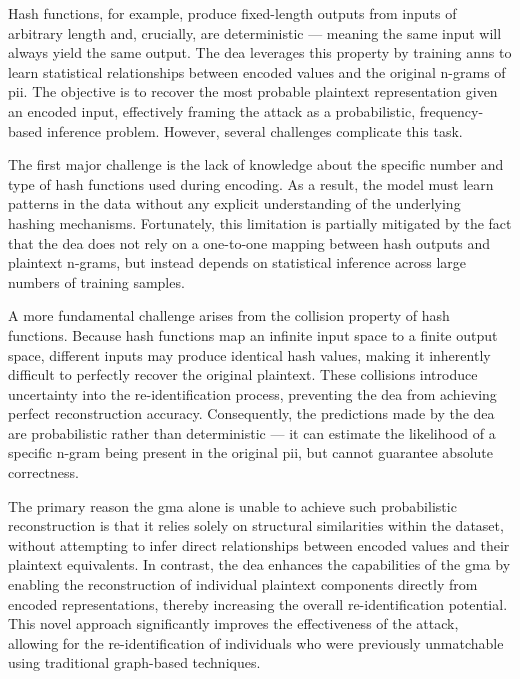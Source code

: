 Hash functions, for example, produce fixed-length outputs from inputs of arbitrary length and, crucially, are deterministic — meaning the same input will always yield the same output.
The \ac{dea} leverages this property by training \ac{ann}s to learn statistical relationships between encoded values and the original n-grams of \ac{pii}.
The objective is to recover the most probable plaintext representation given an encoded input, effectively framing the attack as a probabilistic, frequency-based inference problem.
However, several challenges complicate this task.

The first major challenge is the lack of knowledge about the specific number and type of hash functions used during encoding.
As a result, the model must learn patterns in the data without any explicit understanding of the underlying hashing mechanisms.
Fortunately, this limitation is partially mitigated by the fact that the \ac{dea} does not rely on a one-to-one mapping between hash outputs and plaintext n-grams, but instead depends on statistical inference across large numbers of training samples.

A more fundamental challenge arises from the collision property of hash functions.
Because hash functions map an infinite input space to a finite output space, different inputs may produce identical hash values, making it inherently difficult to perfectly recover the original plaintext.
These collisions introduce uncertainty into the re-identification process, preventing the \ac{dea} from achieving perfect reconstruction accuracy.
Consequently, the predictions made by the \ac{dea} are probabilistic rather than deterministic — it can estimate the likelihood of a specific n-gram being present in the original \ac{pii}, but cannot guarantee absolute correctness.

The primary reason the \ac{gma} alone is unable to achieve such probabilistic reconstruction is that it relies solely on structural similarities within the dataset, without attempting to infer direct relationships between encoded values and their plaintext equivalents.
In contrast, the \ac{dea} enhances the capabilities of the \ac{gma} by enabling the reconstruction of individual plaintext components directly from encoded representations, thereby increasing the overall re-identification potential.
This novel approach significantly improves the effectiveness of the attack, allowing for the re-identification of individuals who were previously unmatchable using traditional graph-based techniques.

